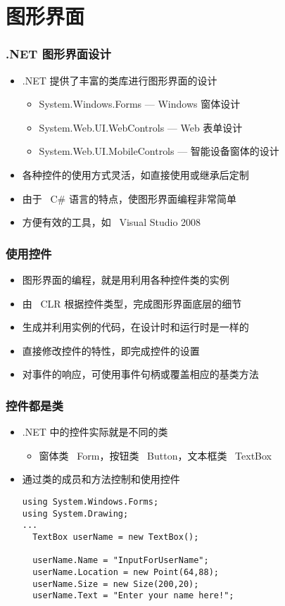 
\section{图形界面}

\begin{frame}
\frametitle{.NET 图形界面设计}
\begin{itemize}
\setlength{\itemsep}{8pt plus 1pt}
\item .NET 提供了丰富的类库进行图形界面的设计
\begin{itemize}
\item System.Windows.Forms --- Windows 窗体设计
\item System.Web.UI.WebControls --- Web 表单设计
\item System.Web.UI.MobileControls --- 智能设备窗体的设计
\end{itemize}
\item 各种控件的使用方式灵活，如直接使用或继承后定制
\item 由于 ~C\# 语言的特点，使图形界面编程非常简单
\item 方便有效的工具，如 ~Visual Studio 2008 
\end{itemize}
\end{frame}

\begin{frame}
\frametitle{使用控件}
\begin{itemize}
\setlength{\itemsep}{8pt plus 1pt}
\item 图形界面的编程，就是用利用各种控件类的实例
\item 由~ CLR 根据控件类型，完成图形界面底层的细节
\item 生成并利用实例的代码，在设计时和运行时是一样的
\item 直接修改控件的特性，即完成控件的设置
\item 对事件的响应，可使用事件句柄或覆盖相应的基类方法
\end{itemize}
\end{frame}

\begin{frame}[fragile]
\frametitle{控件都是类}
\begin{itemize}
\item .NET 中的控件实际就是不同的类
  \begin{itemize}
  \item 窗体类 ~Form，按钮类 ~Button，文本框类 ~TextBox
  \end{itemize}
\item 通过类的成员和方法控制和使用控件
\begin{lstlisting}
using System.Windows.Forms;
using System.Drawing;
...
  TextBox userName = new TextBox();
  
  userName.Name = "InputForUserName";
  userName.Location = new Point(64,88);
  userName.Size = new Size(200,20);
  userName.Text = "Enter your name here!";
\end{lstlisting}
\end{itemize}
\end{frame}

